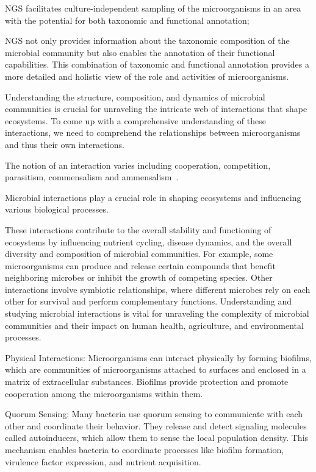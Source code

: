 \documentclass[sn-mathphys,Numbered, lineno]{sn-jnl}  %
\theoremstyle{thmstyleone}%
\theoremstyle{thmstyletwo}%
\theoremstyle{thmstylethree}%
\begin{document}
    NGS facilitates culture-independent sampling of the microorganisms in an area with the potential for both taxonomic and functional annotation;


    NGS not only provides information about the taxonomic composition of the microbial community but also enables the annotation of their functional capabilities. 
    This combination of taxonomic and functional annotation provides a more detailed and holistic view of the role and activities of microorganisms.




    



    Understanding the structure, composition, and dynamics of microbial communities is crucial for unraveling the intricate web of interactions that shape ecosystems. 
    To come up with a comprehensive understanding of these interactions, we need to comprehend the relationships between microorganisms and thus their own interactions.

    The notion of an interaction varies including cooperation, competition, parasitism, commensalism and ammensalism~\cite{faust2012microbialReviewInteractions}.



    Microbial interactions play a crucial role in shaping ecosystems and influencing various biological processes. 

    
    These interactions contribute to the overall stability and functioning of ecosystems by influencing nutrient cycling, disease dynamics, and the overall diversity and composition of microbial communities. 
    For example, some microorganisms can produce and release certain compounds that benefit neighboring microbes or inhibit the growth of competing species. 
    Other interactions involve symbiotic relationships, where different microbes rely on each other for survival and perform complementary functions. 
    Understanding and studying microbial interactions is vital for unraveling the complexity of microbial communities and their impact on human health, agriculture, and environmental processes.


    Physical Interactions: Microorganisms can interact physically by forming biofilms, which are communities of microorganisms attached to surfaces and enclosed in a matrix of extracellular substances. Biofilms provide protection and promote cooperation among the microorganisms within them.

    Quorum Sensing: Many bacteria use quorum sensing to communicate with each other and coordinate their behavior. They release and detect signaling molecules called autoinducers, which allow them to sense the local population density. This mechanism enables bacteria to coordinate processes like biofilm formation, virulence factor expression, and nutrient acquisition.
    
\end{document}
